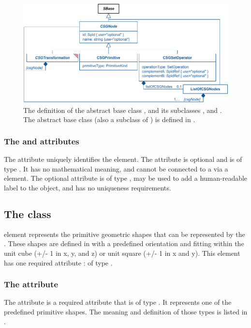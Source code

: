 \begin{figure}[ht]
  \includegraphics{figs/CSGNode-uml}
  \caption{The definition of the abstract base class \CSGNode, and its subclasses \CSGPrimitive, and \CSGSetOperator.  The abstract base class \CSGTransformation (also a subclass of \CSGNode) is defined in .}
  \label{CSGNode-uml}
  \label{CSGPrimitive-uml}
  \label{CSGSetOperator-uml}
  \label{ListOfCSGNodes-uml}
\end{figure}

\subsubsection{The \fixttspace{} and \fixttspace{} attributes}
The  attribute uniquely identifies the \CSGNode element. The attribute is optional and is of type .  It has no mathematical meaning, and cannot be connected to a \Parameter via a \SpatialSymbolReference element.  The optional  attribute is of type , may be used to add a human-readable label to the object, and has no uniqueness requirements.


\subsection{The  class}
\label{csgprimitive-class}
\CSGPrimitive element represents the primitive geometric shapes that can be represented by the \CSGeometry. These shapes are defined in  with a predefined orientation and fitting within the unit cube (+/- 1 in x, y, and z) or unit square (+/- 1 in x and y). This element has one required attribute :  of type .

\subsubsection{The \fixttspace{} attribute}
The  attribute is a required attribute that is of type . It represents one of the predefined primitive shapes.  The meaning and definition of those types is listed in .


